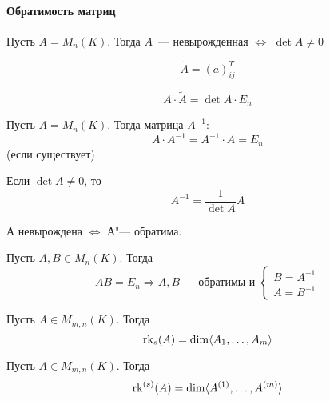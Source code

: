 \documentclass[12pt]{../../../notes}
\begin{document}
\paragraph{Обратимость матриц}

\begin{defn}\label{defn:nonzerodet}
  Пусть $A = M_n(K)$. Тогда $A$~--- невырожденная $\Leftrightarrow$ $\det A \neq 0$
\end{defn}
\begin{defn}\label{defn:adjointmtx}
  \[
    \widetilde{A} = (a)_{ij}^T
  \]
\end{defn}

\begin{lem}\label{lem:adjointmtx}
  \[
    A\cdot\widetilde A = \det A \cdot E_n
  \]
\end{lem}

\begin{defn}\label{defn:invertmtx}
  Пусть $A = M_n(K)$. Тогда матрица $A^{-1}:$
  \[
    A\cdot A^{-1} = A^{-1} \cdot A = E_n
  \]
  (если существует)
\end{defn}

\begin{imp}
  Если $\det A \neq 0$, то
  \[
    A^{-1} = \frac{1}{\det A} \widetilde{A}
  \]
\end{imp}

\begin{imp}
  А невырождена $\Leftrightarrow$ А"--- обратима. 
\end{imp}

\begin{imp}
  Пусть $A,B \in M_n(K)$. Тогда 
  \[
    AB = E_n \Rightarrow A,B \text{~--- обратимы и } 
    \begin{cases}
      B = A^{-1} \\
      A = B^{-1}
    \end{cases}
  \]
\end{imp}

\begin{defn}\label{defn:rowrank}
  Пусть $A\in M_{m,n}(K)$. Тогда \[
    \operatorname{rk}_s (A) = \dim \langle A_1, \dotsc , A_m \rangle
  \]
\end{defn}

\begin{defn}\label{defn:colrank}
  Пусть $A\in M_{m,n}(K)$. Тогда \[
    \operatorname{rk}^{(s)} (A) = \dim \langle A^{(1)}, \dotsc , A^{(m)} \rangle
  \]
\end{defn}
\end{document}
